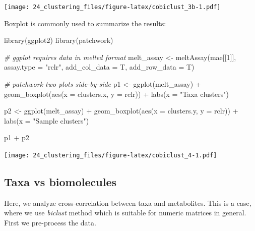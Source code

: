 \documentclass[
]{book}
\newenvironment{Shaded}{\begin{snugshade}}{\end{snugshade}}
\newcommand{\AttributeTok}[1]{\textcolor[rgb]{0.77,0.63,0.00}{#1}}
\newcommand{\CommentTok}[1]{\textcolor[rgb]{0.56,0.35,0.01}{\textit{#1}}}
\newcommand{\DecValTok}[1]{\textcolor[rgb]{0.00,0.00,0.81}{#1}}
\newcommand{\FunctionTok}[1]{\textcolor[rgb]{0.00,0.00,0.00}{#1}}
\newcommand{\NormalTok}[1]{#1}
\newcommand{\OtherTok}[1]{\textcolor[rgb]{0.56,0.35,0.01}{#1}}
\newcommand{\SpecialCharTok}[1]{\textcolor[rgb]{0.00,0.00,0.00}{#1}}
\newcommand{\StringTok}[1]{\textcolor[rgb]{0.31,0.60,0.02}{#1}}
\begin{document}
\texttt{[image: 24\_clustering\_files/figure-latex/cobiclust\_3b-1.pdf]}

Boxplot is commonly used to summarize the results:

\begin{Shaded}
\begin{Highlighting}[]
\FunctionTok{library}\NormalTok{(ggplot2)}
\FunctionTok{library}\NormalTok{(patchwork)}

\CommentTok{\# ggplot requires data in melted format}
\NormalTok{melt\_assay }\OtherTok{\textless{}{-}} \FunctionTok{meltAssay}\NormalTok{(mae[[}\DecValTok{1}\NormalTok{]], }\AttributeTok{assay.type =} \StringTok{"rclr"}\NormalTok{, }
                        \AttributeTok{add\_col\_data =}\NormalTok{ T, }\AttributeTok{add\_row\_data =}\NormalTok{ T)}

\CommentTok{\# patchwork two plots side{-}by{-}side}
\NormalTok{p1 }\OtherTok{\textless{}{-}} \FunctionTok{ggplot}\NormalTok{(melt\_assay) }\SpecialCharTok{+}
    \FunctionTok{geom\_boxplot}\NormalTok{(}\FunctionTok{aes}\NormalTok{(}\AttributeTok{x =}\NormalTok{ clusters.x, }\AttributeTok{y =}\NormalTok{ rclr)) }\SpecialCharTok{+}
    \FunctionTok{labs}\NormalTok{(}\AttributeTok{x =} \StringTok{"Taxa clusters"}\NormalTok{)}

\NormalTok{p2 }\OtherTok{\textless{}{-}} \FunctionTok{ggplot}\NormalTok{(melt\_assay) }\SpecialCharTok{+}
    \FunctionTok{geom\_boxplot}\NormalTok{(}\FunctionTok{aes}\NormalTok{(}\AttributeTok{x =}\NormalTok{ clusters.y, }\AttributeTok{y =}\NormalTok{ rclr)) }\SpecialCharTok{+}
    \FunctionTok{labs}\NormalTok{(}\AttributeTok{x =} \StringTok{"Sample clusters"}\NormalTok{)}

\NormalTok{p1 }\SpecialCharTok{+}\NormalTok{ p2}
\end{Highlighting}
\end{Shaded}

\texttt{[image: 24\_clustering\_files/figure-latex/cobiclust\_4-1.pdf]}

\hypertarget{taxa-vs-biomolecules}{%
\subsection{Taxa vs biomolecules}\label{taxa-vs-biomolecules}}

Here, we analyze cross-correlation between taxa and metabolites. This
is a case, where we use \emph{biclust} method which is suitable for numeric
matrices in general. First we pre-process the data.
\end{document}
